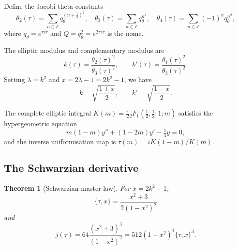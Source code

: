 \documentclass[12pt]{article}
\theoremstyle{plain}
\newtheorem{theorem}{Theorem}[section]
\theoremstyle{definition}
\numberwithin{equation}{section}
\newcommand{\Z}{\mathbb{Z}}
\begin{document}
Define the Jacobi theta constants
\begin{equation}
\theta_2(\tau) = \sum_{n\in\Z} q_\theta^{(n+\frac{1}{2})^2},\quad
\theta_3(\tau) = \sum_{n\in\Z} q_\theta^{n^2},\quad
\theta_4(\tau) = \sum_{n\in\Z} (-1)^n q_\theta^{n^2},
\end{equation}
where $q_\theta=e^{\pi i\tau}$ and $Q=q_\theta^2=e^{2\pi i\tau}$ is the nome.

The elliptic modulus and complementary modulus are
\begin{equation}
k(\tau) = \frac{\theta_2(\tau)^2}{\theta_3(\tau)^2},\qquad
k'(\tau) = \frac{\theta_4(\tau)^2}{\theta_3(\tau)^2}.
\end{equation}
Setting $\lambda=k^2$ and $x=2\lambda-1=2k^2-1$, we have
\begin{equation}
k = \sqrt{\frac{1+x}{2}},\qquad k' = \sqrt{\frac{1-x}{2}}.
\end{equation}

The complete elliptic integral $K(m)=\frac{\pi}{2}{}_2F_1(\frac{1}{2},\frac{1}{2};1;m)$ satisfies the hypergeometric equation
\begin{equation}\label{eq:hypergeometric}
m(1-m)y'' + (1-2m)y' - \tfrac{1}{4}y = 0,
\end{equation}
and the inverse uniformisation map is $\tau(m)=iK(1-m)/K(m)$.

\subsection{The Schwarzian derivative}

\begin{theorem}[Schwarzian master law]\label{thm:schwarzian}
For $x=2k^2-1$,
\begin{equation}
\boxed{\{\tau,x\} = \frac{x^2+3}{2(1-x^2)^2}}
\end{equation}
and
\begin{equation}
\boxed{j(\tau) = 64\frac{(x^2+3)^3}{(1-x^2)^2} = 512(1-x^2)^4\{\tau,x\}^3.}
\end{equation}
\end{theorem}
\end{document}

